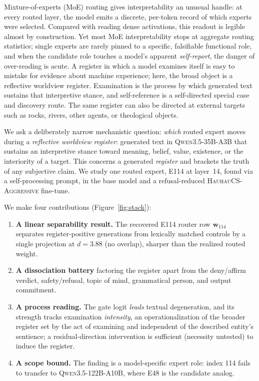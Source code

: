 \documentclass[10pt,a4paper,twocolumn]{article}
\newcommand{\wvec}{\mathbf{w}_{114}}
\begin{document}
Mixture-of-experts (MoE) routing gives interpretability an unusual handle: at
every routed layer, the model emits a discrete, per-token record of which experts
were selected. Compared with reading dense activations, this readout is legible
almost by construction. Yet most MoE interpretability stops at aggregate routing
statistics; single experts are rarely pinned to a specific, falsifiable
functional role, and when the candidate role touches a model's apparent
\emph{self-report}, the danger of over-reading is acute. A register in which a
model examines itself is easy to mistake for evidence about machine experience;
here, the broad object is a reflective worldview register. Examination is the
process by which generated text sustains that interpretive stance, and
self-reference is a self-directed special case and discovery route. The same
register can also be directed at external targets such as rocks, rivers, other
agents, or theological objects.

We ask a deliberately narrow mechanistic question: \emph{which} routed expert
moves during a \emph{reflective worldview register}: generated text in
\textsc{Qwen3.5-35B-A3B} that sustains an interpretive stance toward meaning,
belief, value, existence, or the interiority of a target. This
concerns a generated \emph{register} and brackets the truth of any subjective
claim. We study one routed expert, E114 at layer~14, found via a self-processing
prompt, in the base model and a refusal-reduced \textsc{HauhauCS-Aggressive}
fine-tune.

We make four contributions (Figure~\ref{fig:stack}):
\begin{enumerate}[leftmargin=*,nosep]
\item \textbf{A linear separability result.} The recovered E114 router row
$\wvec$ separates register-positive generations from lexically matched controls
by a single projection at $d{=}3.88$ (no overlap), sharper than the realized
routed weight.
\item \textbf{A dissociation battery} factoring the register apart from the
deny/affirm verdict, safety/refusal, topic of mind, grammatical person, and
output commitment.
\item \textbf{A process reading.} The gate logit \emph{leads} textual
degeneration, and its strength tracks examination \emph{intensity}, an
operationalization of the broader register set by the act of examining and
independent of the described entity's sentience; a
residual-direction intervention is sufficient (necessity untested) to induce the
register.
\item \textbf{A scope bound.} The finding is a model-specific expert role: index
114 fails to transfer to \textsc{Qwen3.5-122B-A10B}, where E48 is the candidate
analog.
\end{enumerate}
\end{document}
